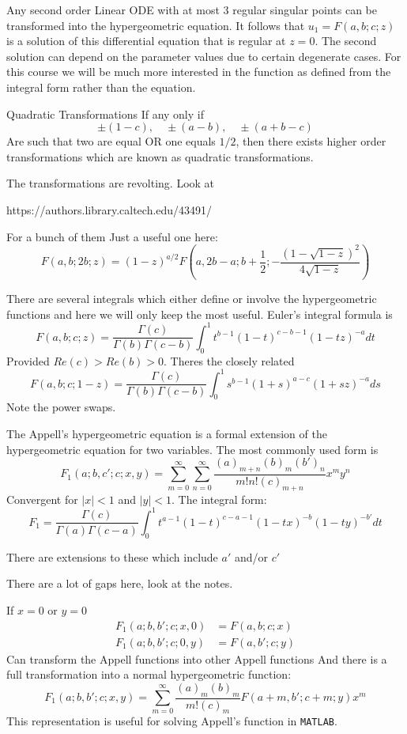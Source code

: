 \documentclass{X:/Documents/Coding/Latex/myassignment}
\begin{document}
Any second order Linear ODE with at most 3 regular singular points can be transformed into the hypergeometric equation. It follows that 
$u_1 = F(a,b;c;z)$ is a solution of this differential equation that is regular at $z=0$. The second solution can depend on the parameter values due to certain degenerate cases. For this course we will be much more interested in the function as defined from the integral form rather than the equation.



Quadratic Transformations
If any only if
\[\pm(1-c),\quad \pm(a-b), \quad \pm(a+b-c)\]
Are such that two are equal OR one equals $1/2$, then there exists higher order transformations which are known as quadratic transformations.

The transformations are revolting.
Look at 


https://authors.library.caltech.edu/43491/


For a bunch of them
Just a useful one here:
\[F(a,b;2b;z) = (1-z)^{a/2} F\left(a,2b-a;b+\frac12; -\frac{(1-\sqrt{1-z})^2}{4\sqrt{1-z}}\right)\]

There are several integrals which either define or involve the hypergeometric functions and here we will only keep the most useful. Euler's integral formula is
\[F(a,b;c;z) = \frac{\Gamma(c)}{\Gamma(b)\Gamma(c-b)} \int_0^1 t^{b-1}(1-t)^{c-b-1}(1-tz)^{-a} dt\]
Provided $Re(c) > Re(b) > 0$. Theres the closely related
\[F(a,b;c;1-z) = \frac{\Gamma(c)}{\Gamma(b)\Gamma(c-b)} \int_0^1 s^{b-1}(1+s)^{a-c}(1+sz)^{-a} ds\]
Note the power swaps.

The Appell's hypergeometric equation is a formal extension of the hypergeometric equation for two variables. The most commonly used form is
\[F_1(a;b,c';c;x,y) = \sum_{m=0}^\infty \sum_{n=0}^\infty \frac{(a)_{m+n}(b)_m (b')_n}{m!n!(c)_{m+n}} x^my^n\]
Convergent for $|x|<1$ and $|y|<1$. The integral form:
\[F_1 = \frac{\Gamma(c)}{\Gamma(a)\Gamma(c-a)} \int_0^1 t^{a-1}(1-t)^{c-a-1}(1-tx)^{-b}(1-ty)^{-b'} dt\]

There are extensions to these which include $a'$ and/or $c'$

There are a lot of gaps here, look at the notes.

If $x=0$ or $y = 0$ 
\begin{align*}
	F_1(a;b,b';c;x,0) &= F(a,b;c;x)\\
	F_1(a;b,b';c;0,y) &= F(a,b';c;y)
\end{align*}
Can transform the Appell functions into other Appell functions
And there is a full transformation into a normal hypergeometric function:
\[F_1(a;b,b';c;x,y) = \sum_{m=0}^\infty \frac{(a)_m(b)_m}{m!(c)_m} F(a+m,b';c+m;y) x^m\]
This representation is useful for solving Appell's function in \verb|MATLAB|.
\end{document}
